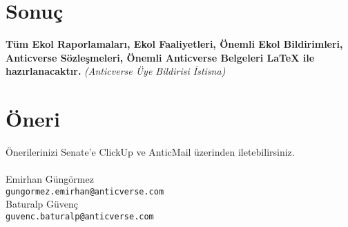 \documentclass{article}
\begin{document}
\section{Sonuç}
\textbf{Tüm Ekol Raporlamaları, Ekol Faaliyetleri, Önemli Ekol Bildirimleri, Anticverse Sözleşmeleri, Önemli Anticverse Belgeleri LaTeX ile hazırlanacaktır. }\textit{(Anticverse Üye Bildirisi İstisna)}

\section*{Öneri}
Önerilerinizi Senate'e ClickUp ve AnticMail üzerinden iletebilirsiniz.\\
\\
Emirhan Güngörmez\\
\texttt{gungormez.emirhan@anticverse.com} \\
Baturalp Güvenç\\
\texttt{guvenc.baturalp@anticverse.com}


\end{document}
